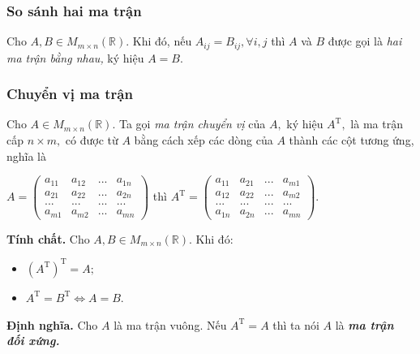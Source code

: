 \subsubsection{So sánh hai ma trận}
Cho $A, B \in M_{m \times n} \left( {\mathbb{R}} \right).$ Khi đó, nếu $A_{ij} = B_{ij}, \forall i, j$ thì $A$ và $B$ được gọi là \textit{hai ma trận bằng nhau,} ký hiệu $A = B.$
\subsubsection{Chuyển vị ma trận}
Cho $A \in  M_{m \times n} \left( {\mathbb{R}} \right).$ Ta gọi \textit{ma trận chuyển vị} của $A,$ ký hiệu $A^\mathrm{T},$ là ma trận cấp $n \times m,$ có được từ $A$ bằng cách xếp các dòng của $A$ thành các cột tương ứng, nghĩa là
\begin{center}
$A = \left( {\begin{array}{*{20}{c}}
  {{a_{11}}}&{{a_{12}}}&{...}&{{a_{1n}}} \\ 
  {{a_{21}}}&{{a_{22}}}&{...}&{{a_{2n}}} \\ 
  {...}&{...}&{...}&{...} \\ 
  {{a_{m1}}}&{{a_{m2}}}&{...}&{{a_{mn}}} 
\end{array}} \right)$
 thì ${A^\mathrm{T}} = \left( {\begin{array}{*{20}{c}}
  {{a_{11}}}&{{a_{21}}}&{...}&{{a_{m1}}} \\ 
  {{a_{12}}}&{{a_{22}}}&{...}&{{a_{m2}}} \\ 
  {...}&{...}&{...}&{...} \\ 
  {{a_{1n}}}&{{a_{2n}}}&{...}&{{a_{mn}}} 
\end{array}} \right).$
\end{center}
\begin{mybox}
\textbf{Tính chất.}
Cho $A, B \in M_{m \times n} \left( {\mathbb{R}} \right).$ Khi đó:
\begin{itemize}
\item $\left( {A^{\mathrm{T}} }\right) ^ {\mathrm{T}} = A;$
\item $ A^{\mathrm{T}} = B ^ {\mathrm{T}} \Leftrightarrow A = B.$
\end{itemize}
\end{mybox}
\begin{mybox}
\textbf{Định nghĩa.} Cho $A$ là ma trận vuông. Nếu $A ^ {\mathrm{T}} = A$ thì ta nói $A$ là \textbf{\textit{ma trận đối xứng.}}
\end{mybox}
